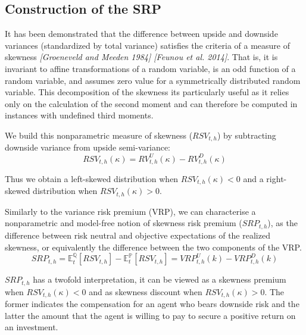 \subsection{Construction of the SRP}
It has been demonstrated that the difference between upside and downside variances (standardized by total variance) satisfies the criteria of a measure of skewness \textit{[Groeneveld and Meeden 1984] [Feunou et al. 2014]}. That is, it is invariant to affine transformations of a random variable, is an odd function of a random variable, and assumes zero value for a symmetrically distributed random variable. This decomposition of the skewness its particularly useful as it relies only on the calculation of the second moment and can therefore be computed in instances with undefined third moments.

\vspace{4mm}
We build this nonparametric measure of skewness ($RSV_{t,h}$) by subtracting downside variance from upside semi-variance:
\begin{equation}\label{eq:RSV}
RSV_{t,h}(\kappa)=RV_{t,h}^U(\kappa)- RV_{t,h}^D(\kappa)
\end{equation}

Thus we obtain a left-skewed distribution when $RSV_{t,h}(\kappa)<0$ and a right-skewed distribution when $RSV_{t,h}(\kappa)>0$.

\vspace{4mm}
Similarly to the variance risk premium (VRP), we can characterise a nonparametric and model-free notion of skewness risk premium ($SRP_{t,h}$), as the difference between risk neutral and objective expectations of the realized skewness, or equivalently the difference between the two components of the VRP.
\begin{equation}\label{eq:SRP}
SRP_{t,h}=\mathbb{E}_{t}^{\mathbb{Q}}[RSV_{t,h}]-\mathbb{E}_{t}^{\mathbb{P}}[RSV_{t,h}]=VRP^U_{t,h}(k)-VRP^D_{t,h}(k)
\end{equation}

$SRP_{t,h}$ has a twofold interpretation, it can be viewed as a skewness premium when $RSV_{t,h}(\kappa)<0$ and as skewness discount when $RSV_{t,h}(\kappa)>0$. The former indicates the compensation for an agent who bears downside risk and the latter the amount that the agent is willing to pay to secure a positive return on an investment.

